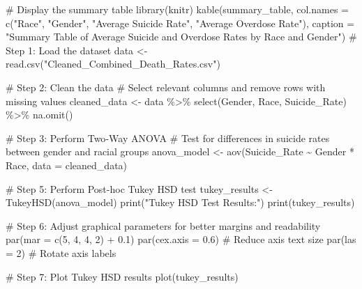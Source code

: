 \documentclass[
  letterpaper,
  DIV=11,
  numbers=noendperiod]{scrartcl}
\newenvironment{Shaded}{\begin{snugshade}}{\end{snugshade}}
\newcommand{\AttributeTok}[1]{\textcolor[rgb]{0.40,0.45,0.13}{#1}}
\newcommand{\CommentTok}[1]{\textcolor[rgb]{0.37,0.37,0.37}{#1}}
\newcommand{\DecValTok}[1]{\textcolor[rgb]{0.68,0.00,0.00}{#1}}
\newcommand{\FloatTok}[1]{\textcolor[rgb]{0.68,0.00,0.00}{#1}}
\newcommand{\FunctionTok}[1]{\textcolor[rgb]{0.28,0.35,0.67}{#1}}
\newcommand{\NormalTok}[1]{\textcolor[rgb]{0.00,0.23,0.31}{#1}}
\newcommand{\OtherTok}[1]{\textcolor[rgb]{0.00,0.23,0.31}{#1}}
\newcommand{\SpecialCharTok}[1]{\textcolor[rgb]{0.37,0.37,0.37}{#1}}
\newcommand{\StringTok}[1]{\textcolor[rgb]{0.13,0.47,0.30}{#1}}
\begin{document}
\begin{Shaded}
\begin{Highlighting}[]
\CommentTok{\# Display the summary table}
\FunctionTok{library}\NormalTok{(knitr)}
\FunctionTok{kable}\NormalTok{(summary\_table, }
      \AttributeTok{col.names =} \FunctionTok{c}\NormalTok{(}\StringTok{"Race"}\NormalTok{, }\StringTok{"Gender"}\NormalTok{, }\StringTok{"Average Suicide Rate"}\NormalTok{, }\StringTok{"Average Overdose Rate"}\NormalTok{),}
      \AttributeTok{caption =} \StringTok{"Summary Table of Average Suicide and Overdose Rates by Race and Gender"}\NormalTok{)}
\CommentTok{\# Step 1: Load the dataset}
\NormalTok{data }\OtherTok{\textless{}{-}} \FunctionTok{read.csv}\NormalTok{(}\StringTok{"Cleaned\_Combined\_Death\_Rates.csv"}\NormalTok{)}

\CommentTok{\# Step 2: Clean the data}
\CommentTok{\# Select relevant columns and remove rows with missing values}
\NormalTok{cleaned\_data }\OtherTok{\textless{}{-}}\NormalTok{ data }\SpecialCharTok{\%\textgreater{}\%}
  \FunctionTok{select}\NormalTok{(Gender, Race, Suicide\_Rate) }\SpecialCharTok{\%\textgreater{}\%}
  \FunctionTok{na.omit}\NormalTok{()}

\CommentTok{\# Step 3: Perform Two{-}Way ANOVA}
\CommentTok{\# Test for differences in suicide rates between gender and racial groups}
\NormalTok{anova\_model }\OtherTok{\textless{}{-}} \FunctionTok{aov}\NormalTok{(Suicide\_Rate }\SpecialCharTok{\textasciitilde{}}\NormalTok{ Gender }\SpecialCharTok{*}\NormalTok{ Race, }\AttributeTok{data =}\NormalTok{ cleaned\_data)}

\CommentTok{\# Step 5: Perform Post{-}hoc Tukey HSD test}
\NormalTok{tukey\_results }\OtherTok{\textless{}{-}} \FunctionTok{TukeyHSD}\NormalTok{(anova\_model)}
\FunctionTok{print}\NormalTok{(}\StringTok{"Tukey HSD Test Results:"}\NormalTok{)}
\FunctionTok{print}\NormalTok{(tukey\_results)}

\CommentTok{\# Step 6: Adjust graphical parameters for better margins and readability}
\FunctionTok{par}\NormalTok{(}\AttributeTok{mar =} \FunctionTok{c}\NormalTok{(}\DecValTok{5}\NormalTok{, }\DecValTok{4}\NormalTok{, }\DecValTok{4}\NormalTok{, }\DecValTok{2}\NormalTok{) }\SpecialCharTok{+} \FloatTok{0.1}\NormalTok{)}
\FunctionTok{par}\NormalTok{(}\AttributeTok{cex.axis =} \FloatTok{0.6}\NormalTok{)        }\CommentTok{\# Reduce axis text size}
\FunctionTok{par}\NormalTok{(}\AttributeTok{las =} \DecValTok{2}\NormalTok{)               }\CommentTok{\# Rotate axis labels}

\CommentTok{\# Step 7: Plot Tukey HSD results}
\FunctionTok{plot}\NormalTok{(tukey\_results)}
\end{Highlighting}
\end{Shaded}
\end{document}
